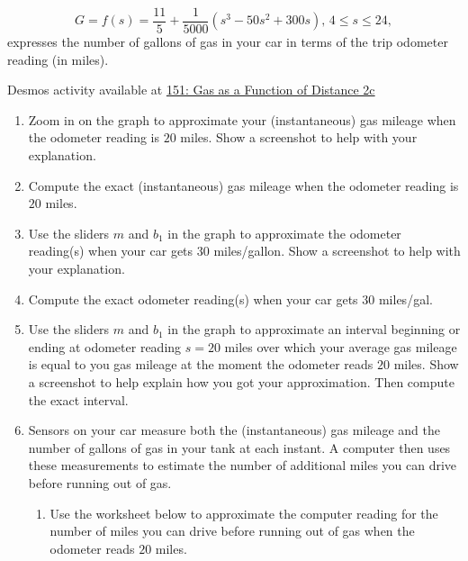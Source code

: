 \documentclass{ximera}
\begin{document}
\begin{question} \label{QLF41zefdf45}
\[
   G = f(s) = \frac{11}{5} +\frac{1}{5000}\left( s^3-50s^2+300s \right) , \, 4\leq s \leq 24 ,
\]
expresses the number of gallons of gas in your car in terms of the trip odometer reading (in miles).

\begin{onlineOnly}
    \begin{center}
\end{center}
\end{onlineOnly}

Desmos activity available at
\href{https://www.desmos.com/calculator/ny3z9ixyr1}{151: Gas as a Function of Distance 2c}

\begin{enumerate}

\item Zoom in on the graph to approximate your (instantaneous) gas mileage when the odometer reading is $20$ miles. Show a screenshot to help with your explanation.

\item Compute the exact (instantaneous) gas mileage when the odometer reading is $20$ miles. 

\item Use the sliders $m$ and $b_1$ in the graph to approximate the odometer reading(s) when your car gets $30$ miles/gallon. Show a screenshot to help with your explanation.

\item Compute the exact odometer reading(s) when your car gets $30$ miles/gal.  

\item Use the sliders $m$ and $b_1$ in the graph to approximate an interval beginning or ending at odometer reading $s=20$ miles over which your average gas mileage is equal to you gas mileage at the moment the odometer reads $20$ miles. Show a screenshot to help explain how you got your approximation. Then compute the exact interval.

\item Sensors on your car measure both the (instantaneous) gas mileage and the number of gallons of gas in your tank at each instant. A computer then uses these measurements to estimate the number of additional miles you can drive before running out of gas. 

\begin{enumerate}

\item Use the worksheet below to approximate the computer reading for the number of miles you can drive before running out of gas when the odometer reads $20$ miles.


\end{enumerate}
\end{enumerate}
\end{question}
\end{document}
